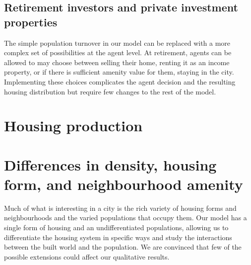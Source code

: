 



\subsection{Retirement investors and private investment properties}
The simple population turnover in our model can be replaced with a more complex set of possibilities at the agent level.  At retirement,  agents can be allowed to may choose between selling their home, renting it as an income property, or if there is sufficient amenity value for them, staying in the city. Implementing these choices complicates the agent decision and the resulting housing distribution but require few changes to the rest of the model.

\section{Housing production}

\section{Differences in density, housing form, and neighbourhood amenity}
Much of what is interesting in a city is the rich variety of housing forms and neighbourhoods and the varied populations that occupy them. Our model has a single form of housing and an undifferentiated populations, allowing us to differentiate the housing system in specific ways and study the interactions between the built world and the population. We are convinced that few of the possible extensions could affect our qualitative results. 

